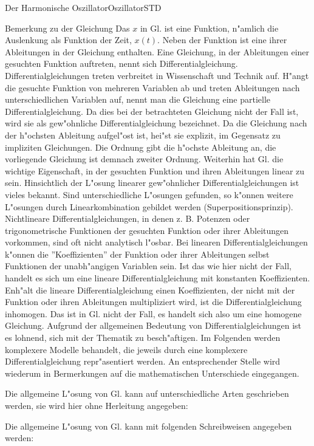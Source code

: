 \begin{MXContent}{Der Harmonische Oszillator}{Oszillator}{STD}
  \begin{MHint}{Bemerkung zu der Gleichung}
  Das $x$ in Gl.  ist eine Funktion, n"amlich die Auslenkung als Funktion der Zeit, $x(t)$. Neben der Funktion ist eine ihrer Ableitungen in der Gleichung enthalten. Eine Gleichung, in der Ableitungen einer gesuchten Funktion auftreten, nennt sich Differentialgleichung. Differentialgleichungen treten verbreitet in Wissenschaft und Technik auf. H"angt die gesuchte Funktion von mehreren Variablen ab und treten Ableitungen nach unterschiedlichen Variablen auf, nennt man die Gleichung eine partielle Differentialgleichung. Da dies bei der betrachteten Gleichung nicht der Fall ist, wird sie als gew"ohnliche Differentialgleichung bezeichnet. Da die Gleichung nach der h"ochsten Ableitung aufgel"ost ist, hei"st sie explizit, im Gegensatz zu impliziten Gleichungen. Die Ordnung gibt die h"ochste Ableitung an, die vorliegende Gleichung ist demnach zweiter Ordnung. Weiterhin hat Gl.  die wichtige Eigenschaft, in der gesuchten Funktion und ihren Ableitungen linear zu sein. Hinsichtlich der L"osung linearer gew"ohnlicher Differentialgleichungen ist vieles bekannt. Sind unterschiedliche L"osungen gefunden, so k"onnen weitere L"osungen durch Linearkombination gebildet werden (Superpositionsprinzip). Nichtlineare Differentialgleichungen, in denen z. B. Potenzen oder trigonometrische Funktionen der gesuchten Funktion oder ihrer Ableitungen vorkommen, sind oft nicht analytisch l"osbar. Bei linearen Differentialgleichungen k"onnen die ''Koeffizienten'' der Funktion oder ihrer Ableitungen selbst Funktionen der unabh"angigen Variablen sein. Ist das wie hier nicht der Fall, handelt es sich um eine lineare Differentialgleichung mit konstanten Koeffizienten. Enh"alt die lineare Differentialgleichung einen Koeffizienten, der nicht mit der Funktion oder ihren Ableitungen multipliziert wird, ist die Differentialgleichung inhomogen. Das ist in Gl.  nicht der Fall, es handelt sich also um eine homogene Gleichung.
  Aufgrund der allgemeinen Bedeutung von Differentialgleichungen ist es lohnend, sich mit der Thematik zu besch"aftigen. Im Folgenden werden komplexere Modelle behandelt, die jeweils durch eine komplexere Differentialgleichung repr"asentiert werden. An entsprechender Stelle wird wiederum in Bermerkungen auf die mathematischen Unterschiede eingegangen.
  \end{MHint}

Die allgemeine L"osung von Gl.  kann auf unterschiedliche Arten geschrieben werden, sie wird hier ohne Herleitung angegeben:
\begin{MInfo}
Die allgemeine L"osung von Gl.  kann mit folgenden Schreibweisen angegeben werden:


\end{MInfo}
\end{MXContent}
